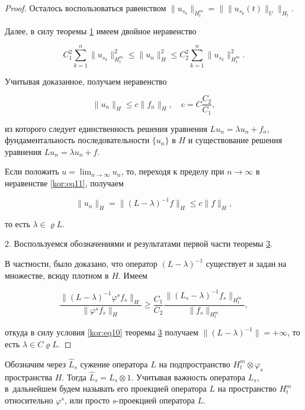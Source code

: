 \begin{proof}
Осталось воспользоваться равенством $\|u_{s_k}\|_{H_t^m}=\|\|u_{s_k}(t)\|_U\|_{H_t}$.



Далее, в силу теоремы \hyperlink{korn:th:1}{1} имеем двойное неравенство

$$

C_1^2\sum\limits_{k=1}^n{\|u_{s_k}\|_{H_t^m}^2}\le\|u_n\|_H^2\le C_2^2\sum\limits_{k=1}^n{\|u_{s_k}\|_{H_t^m}^2.}

$$

Учитывая доказанное, получаем неравенство 

\begin{equation}

\label{kor:eq11}

\|u_n\|_H\le c\|f_n\|_H,\quad c=C\frac{C_2}{C_1},

\end{equation}

из которого следует единственность решения уравнения $Lu_n=\lambda u_n+f_n$, фундаментальность последовательности $\{u_n\}$ в $H$ и существование решения уравнения $Lu_n=\lambda u_n+f$. 

Если положить $u=\lim _{n\to\infty}u_n$, то, переходя к пределу при $n\to\infty$ в неравенстве \eqref{kor:eq11}, получаем 

$$

\|u_n\|_H=\|(L-\lambda)^{-1}f\|_H\le c\|f\|_{H}, 

$$

то есть $\lambda\in\varrho L$.



2. Воспользуемся обозначениями и результатами первой части теоремы \hyperlink{korn:th:3}{3}. 

В частности, было доказано, что оператор $(L-\lambda)^{-1}$ существует и задан на множестве, всюду плотном в $H$. Имеем

$$

\frac{\|(L-\lambda)^{-1}\varphi^sf_s\|_H}{\|\varphi^sf_s\|_H}\ge\frac{C_1}{C_2}\frac{\|(L_s-\lambda)^{-1}f_s\|_{H_t^m}}{\|f_s\|_{H_t^m}},

$$

откуда в силу условия \eqref{kor:eq10} теоремы \hyperlink{korn:th:3}{3} получаем $\|(L-\lambda)^{-1}\|=+\infty$, то есть $\lambda\in C\varrho L$. \end{proof}



\smallskip



Обозначим через $\widehat{L}_s$ сужение оператора $L$ на подпространство $H_t^m\otimes\varphi_s$ пространства $H$. Тогда $\widehat{L}_s=L_s\otimes1$. Учитывая важность оператора $L_s$, в~дальнейшем будем называть его проекцией оператора $L$ на пространство $H_t^m$ относительно $\varphi^s$, или просто $s$-проекцией оператора $L$.



